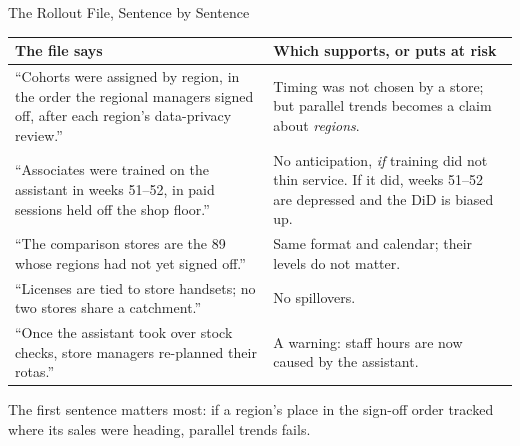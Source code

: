 \documentclass[aspectratio=169, 11pt, handout]{beamer}
\begin{document}
\begin{frame}{The Rollout File, Sentence by Sentence}

\begin{center}
\small
\begin{tabular}{L{6.6cm}L{6.4cm}}
\toprule
\textbf{The file says} & \textbf{Which supports, or puts at risk} \\
\midrule
``Cohorts were assigned by region, in the order the regional managers signed off, after each region's data-privacy review.'' & Timing was not chosen by a store; but parallel trends becomes a claim about \emph{regions}. \\[0.4em]
``Associates were trained on the assistant in weeks 51--52, in paid sessions held off the shop floor.'' & No anticipation, \emph{if} training did not thin service. If it did, weeks 51--52 are depressed and the DiD is biased up. \\[0.4em]
``The comparison stores are the 89 whose regions had not yet signed off.'' & Same format and calendar; their levels do not matter. \\[0.4em]
``Licenses are tied to store handsets; no two stores share a catchment.'' & No spillovers. \\[0.4em]
``Once the assistant took over stock checks, store managers re-planned their rotas.'' & A warning: staff hours are now caused by the assistant. \\
\bottomrule
\end{tabular}
\end{center}

\medskip

\small The first sentence matters most: if a region's place in the sign-off order tracked where its sales were heading, parallel trends fails.
\end{frame}
\end{document}
